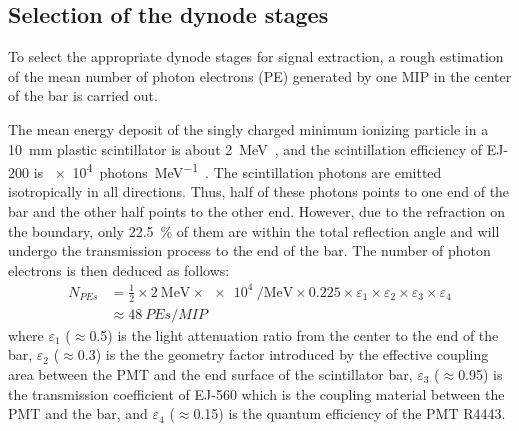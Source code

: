\documentclass[preprint, times]{elsarticle}
\begin{document}
\subsection{Selection of the dynode stages}
\label{sec:dynodes_selection}
To select the appropriate dynode stages for signal extraction, a rough estimation of the mean number of photon electrons (PE) generated by one MIP in the center of the bar is carried out.

The mean energy deposit of the singly charged minimum ionizing particle in a \SI{10}{\milli\meter} plastic scintillator is about \SI{2}{\mega\electronvolt}~\cite{olive_review_2014}, and the scintillation efficiency of EJ-200 is \SI[per-mode=symbol]{e4}{photons\per\mega\electronvolt}~\cite{scintillator}.
The scintillation photons are emitted isotropically in all directions.
Thus, half of these photons points to one end of the bar and the other half points to the other end.
However, due to the refraction on the boundary, only \SI{22.5}{\percent} of them are within the total reflection angle and will undergo the transmission process to the end of the bar.
The number of photon electrons is then deduced as follows:
\begin{align}
 N_{PEs} &= \frac{1}{2} \times \SI[per-mode=symbol]{2}{\mega\electronvolt} \times \SI{e4}{\per\mega\electronvolt} \times 0.225
           \times \varepsilon_{1} \times \varepsilon_{2} \times \varepsilon_{3} \times \varepsilon_{4} \nonumber \\
         &\approx \SI{48}{PEs\per{MIP}}
\label{eq:pes}
\end{align}
where $\varepsilon_1$ ($\approx$0.5) is the light attenuation ratio from the center to the end of the bar,
$\varepsilon_2$ ($\approx$0.3) is the the geometry factor introduced by the effective coupling area between the PMT and the end surface of the scintillator bar,
$\varepsilon_3$ ($\approx$0.95) is the transmission coefficient of EJ-560 which is the coupling material between the PMT and the bar,
and $\varepsilon_4$ ($\approx$0.15) is the quantum efficiency of the PMT R4443.
\end{document}

